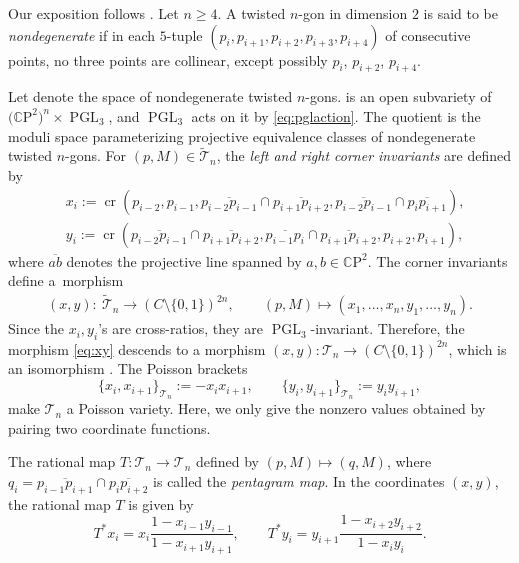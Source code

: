 \documentclass[10pt,a4paper]{amsart}
\numberwithin{equation}{section}
\newcommand{\C}{{\mathbb C}}
\newcommand{\CP}{{\mathbb C\mathrm P}}
\newcommand{\PGL}{\operatorname{PGL}}
\newcommand{\ra}{\rightarrow}
\newcommand{\be}{\begin{equation}}
\newcommand{\ee}{\end{equation}}
\newcommand{\la}{\label}
\def\cro{\operatorname{cr}}
\def\C{C}
\begin{document}
	Our exposition follows \cite{OST1,Weinreich}.
	Let $n \geq 4$. A twisted $n$-gon in dimension $2$ is said to be \emph{nondegenerate} if in each $5$-tuple $(p_i,p_{i+1},p_{i+2},p_{i+3},p_{i+4})$ of consecutive points, no three points are collinear, except possibly $p_i$, $p_{i+2}$, $p_{i+4}$.
	
	Let  denote the space of nondegenerate twisted $n$-gons.  is an open subvariety of $\big(\CP^2\big)^n \times \PGL_3$, and $\PGL_3$ acts on it by \eqref{eq:pglaction}. The quotient \smash{$\mathcal T_n:=\widetilde{\mathcal T}_n / \PGL_3$} is the moduli space parameterizing projective equivalence classes of nondegenerate twisted $n$-gons. For $(p,M) \in \widetilde{\mathcal T}_n$, the \textit{left and right corner invariants} are defined by
	\begin{align*}
		&x_i:= \cro(p_{i-2},p_{i-1},\overline{p_{i-2} p_{i-1}} \cap \overline{p_{i+1} p_{i+2}} ,\overline{p_{i-2} p_{i-1}}\cap \overline{p_i p_{i+1}} ),\\
		&y_i:= \cro( \overline{p_{i-2} p_{i-1}} \cap \overline{p_{i+1} p_{i+2}},\overline{p_{i-1} p_{i}}\cap \overline{p_{i+1} p_{i+2}},p_{i+2},p_{i+1}),
	\end{align*}
	where $\overline{ab}$ denotes the projective line spanned by $a,b \in \CP^2$. The corner invariants define a~morphism
	\begin{align}
		(x,y)\colon \ \widetilde{\mathcal T}_n \ra (\C \setminus\{0,1\})^{2n} , \qquad
		(p,M) \mapsto (x_1,\dots,x_n,y_1,\dots,y_n).\la{eq:xy}
	\end{align}
	Since the $x_i,y_i$'s are cross-ratios, they are $\PGL_3$-invariant. Therefore, the morphism \eqref{eq:xy} descends to a morphism $(x,y)\colon \mathcal T_n \ra (\C \setminus\{0,1\})^{2n}$, which is an isomorphism \cite{Schwartz}. The Poisson brackets
	\be \la{pent:pb}
	\{x_i,x_{i + 1}\}_{\mathcal T_n}:= - x_i x_{i+1}, \qquad \{y_i,y_{i + 1}\}_{\mathcal T_n} := y_i y_{i+1},
	\ee
	make $\mathcal T_n$ a Poisson variety. Here, we only give the nonzero values obtained by pairing two coordinate functions.

	The rational map $T\colon \mathcal T_n \ra \mathcal T_n$ defined by $(p,M) \mapsto (q,M)$, where $q_i=\overline{p_{i-1}p_{i+1}}\cap \overline{p_{i}p_{i+2}}$ is called the \textit{pentagram map}. In the coordinates $(x,y)$, the rational map $T$ is given by {\cite[Lemma~2.4]{OST1}}
	\[
	T^* x_i = x_i \frac{1-x_{i-1}y_{i-1}}{1-x_{i+1}y_{i+1}}, \qquad T^* y_i = y_{i+1} \frac{1-x_{i+2}y_{i+2}}{1-x_{i}y_{i}}.
	\]
	
\end{document}
